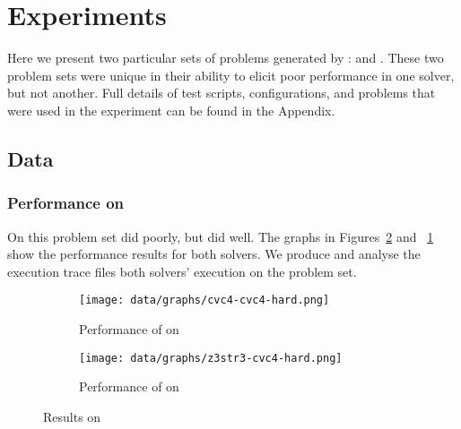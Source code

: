 \section{Experiments}

    Here we present two particular sets of problems generated by \fuzzer{}: \cHard{} and \zHard{}. These two problem sets were unique in their ability to elicit poor performance in one solver, but not another. Full details of test scripts, configurations, and problems that were used in the experiment can be found in the Appendix.


    \subsection{Data}

        \subsubsection{Performance on \cHard{}}

            On this problem set \cvc{} did poorly, but \us{} did well. The graphs in Figures~\ref{fig:z3str3-cvc4-hard} and ~\ref{fig:cvc4-cvc4-hard} show the performance results for both solvers. We produce and analyse the execution trace files both solvers' execution on the problem set.

            \begin{figure}[h]
                \begin{subfigure}{.5\textwidth}
                    \texttt{[image: data/graphs/cvc4-cvc4-hard.png]}
                    \caption{Performance of \cvc{} on \cHard{}}
                    \label{fig:cvc4-cvc4-hard}
                \end{subfigure}
                \begin{subfigure}{.5\textwidth}
                    \texttt{[image: data/graphs/z3str3-cvc4-hard.png]}
                    \caption{Performance of \us{} on \cHard{}}
                    \label{fig:z3str3-cvc4-hard}
                \end{subfigure}
                \caption{Results on \cHard}
                \label{fig:cvc4-hard}
            \end{figure}

